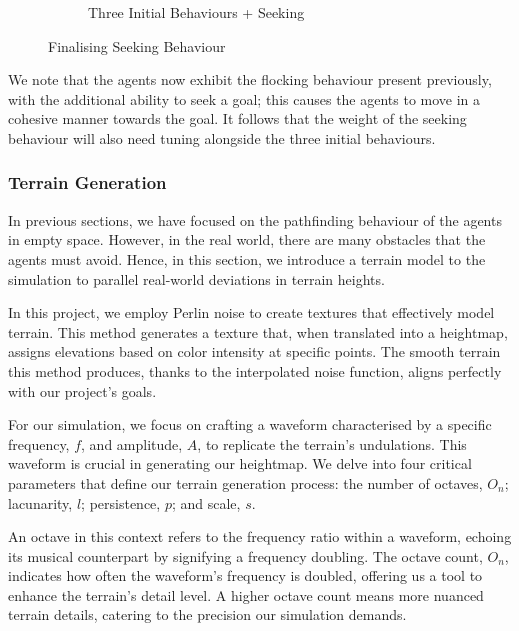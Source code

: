 \documentclass[12pt]{article}
\begin{document}
\begin{figure}[ht]
\begin{subfigure}{.45\textwidth}
\caption{Three Initial Behaviours + Seeking}
\label{fig:exp7}
\end{subfigure}
\caption{Finalising Seeking Behaviour}
\label{fig:exp67}
\end{figure}

We note that the agents now exhibit the flocking behaviour present previously, with the additional ability to seek a goal; this causes the agents to move in a cohesive manner towards the goal. It follows that the weight of the seeking behaviour will also need tuning alongside the three initial behaviours. 

\subsubsection{Terrain Generation}
In previous sections, we have focused on the pathfinding behaviour of the agents in empty space. However, in the real world, there are many obstacles that the agents must avoid. Hence, in this section, we introduce a terrain model to the simulation to parallel real-world deviations in terrain heights. 

In this project, we employ Perlin noise\cite[289-293]{Perlin} to create textures that effectively model terrain. This method generates a texture that, when translated into a heightmap, assigns elevations based on color intensity at specific points. The smooth terrain this method produces, thanks to the interpolated noise function, aligns perfectly with our project's goals.

For our simulation, we focus on crafting a waveform characterised by a specific frequency, \(f\), and amplitude, \(A\), to replicate the terrain's undulations. This waveform is crucial in generating our heightmap. We delve into four critical parameters that define our terrain generation process: the number of octaves, \(O_n\); lacunarity, \(l\); persistence, \(p\); and scale, \(s\).

An octave in this context refers to the frequency ratio within a waveform, echoing its musical counterpart by signifying a frequency doubling. The octave count, \(O_n\), indicates how often the waveform's frequency is doubled, offering us a tool to enhance the terrain's detail level. A higher octave count means more nuanced terrain details, catering to the precision our simulation demands.
\end{document}
